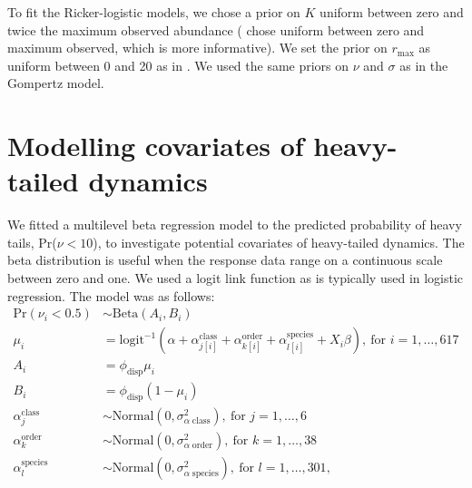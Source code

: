 To fit the Ricker-logistic models, we chose a prior on $K$ uniform between zero and twice the maximum observed abundance (\citet{clark2010} chose uniform between zero and maximum observed, which is more informative). We set the prior on $r_\mathrm{max}$ as uniform between 0 and 20 as in \citet{clark2010}. We used the same priors on $\nu$ and $\sigma$ as in the Gompertz model.

\section{Modelling covariates of heavy-tailed dynamics}

We fitted a multilevel beta regression model to the predicted probability of heavy tails, Pr($\nu < 10$), to investigate potential covariates of heavy-tailed dynamics. The beta distribution is useful when the response data range on a continuous scale between zero and one. We used a logit link function as is typically used in logistic regression. The model was as follows: 
\begin{align*}
\mathrm{Pr}(\nu_i < 0.5) &\sim \mathrm{Beta}(A_i, B_i)\\
\mu_i &= \mathrm{logit}^{-1}(\alpha 
  + \alpha^\mathrm{class}_{j[i]}
  + \alpha^\mathrm{order}_{k[i]} 
  + \alpha^\mathrm{species}_{l[i]}
  + X_i \beta),
  \: \text{for } i = 1, \dots, 617\\
A_i &= \phi_\mathrm{disp} \mu_i\\
B_i &= \phi_\mathrm{disp} (1 - \mu_i)\\
\alpha^\mathrm{class}_j &\sim 
  \mathrm{Normal}(0, \sigma^2_{\alpha \; \mathrm{class}}), 
  \: \text{for } j = 1, \dots, 6\\
\alpha^\mathrm{order}_k &\sim 
  \mathrm{Normal}(0, \sigma^2_{\alpha \; \mathrm{order}}), 
  \: \text{for } k = 1, \dots, 38\\
\alpha^\mathrm{species}_l &\sim 
  \mathrm{Normal}(0, \sigma^2_{\alpha \; \mathrm{species}}),
  \: \text{for } l = 1, \dots, 301,\\
\end{align*}
